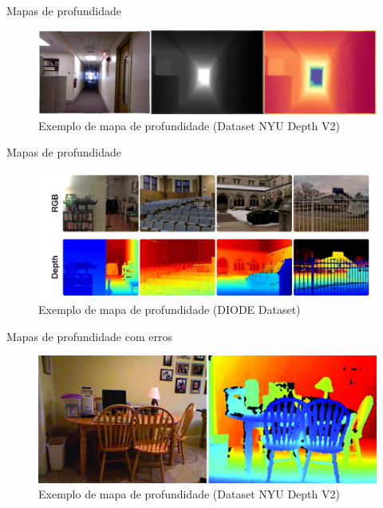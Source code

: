 \documentclass[aspectratio=169]{beamer}
\begin{document}
\begin{frame}{Mapas de profundidade}

\begin{figure}
    \centering
    \includegraphics[width=\textwidth]{figs/example_depth.png}
    \caption{Exemplo de mapa de profundidade (Dataset NYU Depth V2)}
    \label{fig:enter-label}
\end{figure}
\end{frame}

\begin{frame}{Mapas de profundidade}

\begin{figure}
    \centering
    \includegraphics[width=\textwidth]{figs/exemplo1.png}
    \caption{Exemplo de mapa de profundidade (DIODE Dataset)}
    \label{fig:enter-label}
\end{figure}
\end{frame}


\begin{frame}{Mapas de profundidade com erros}

\begin{figure}
    \centering
    \includegraphics[scale=2]{figs/nyu_depth_v2_raw.jpg}
    \caption{Exemplo de mapa de profundidade (Dataset NYU Depth V2)}
    \label{fig:enter-label}
\end{figure}
\end{frame}
\end{document}
